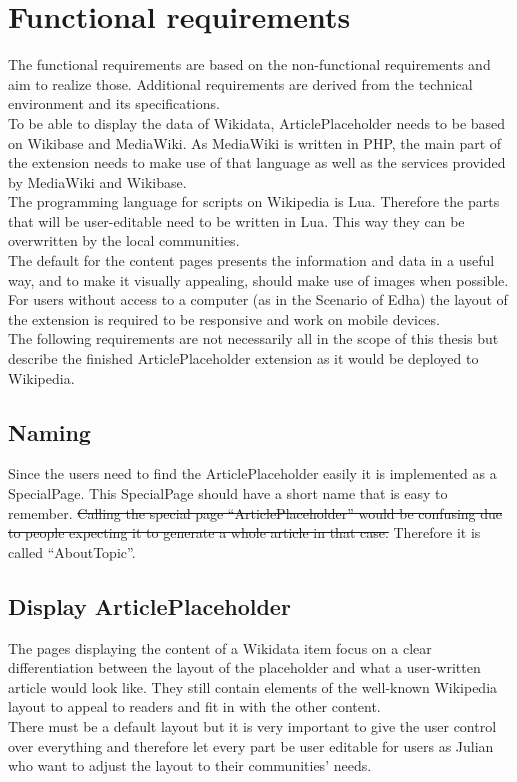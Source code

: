 \chapter {Functional requirements}

The functional requirements are based on the non-functional requirements and aim to realize those. Additional requirements are derived from the technical environment and its specifications. \\
To be able to display the data of Wikidata, ArticlePlaceholder needs to be based on Wikibase and MediaWiki.
As MediaWiki is written in PHP, the main part of the extension needs to make use of that language as well as the services provided by MediaWiki and Wikibase. \\
The programming language for scripts on Wikipedia is Lua. Therefore the parts that will be user-editable need to be written in Lua. This way they can be overwritten by the local communities. \\
The default for the content pages presents the information and data in a useful way, and to make it visually appealing, should make use of images when possible.
For users without access to a computer (as in the Scenario of Edha) the layout of the extension is required to be responsive and work on mobile devices. \\
The following requirements are not necessarily all in the scope of this thesis but describe the finished ArticlePlaceholder extension as it would be deployed to Wikipedia.

\section{Naming}
Since the users need to find the ArticlePlaceholder easily it is implemented as a SpecialPage. This SpecialPage should have a short name that is easy to remember. \st{Calling the special page ``ArticlePlaceholder'' would be confusing due to people expecting it to generate a whole article in that case.}  Therefore it is called ``AboutTopic''.

\section{Display ArticlePlaceholder}
The pages displaying the content of a Wikidata item focus on a clear differentiation between the layout of the placeholder and what a user-written article would look like. They still contain elements of the well-known Wikipedia layout to appeal to readers and fit in with the other content. \\
There must be a default layout but it is very important to give the user control over everything and therefore let every part be user editable for users as Julian who want to adjust the layout to their communities' needs.

